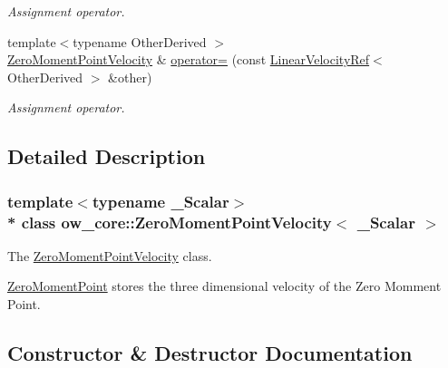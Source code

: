 \begin{DoxyCompactItemize}
\begin{DoxyCompactList}\small\item\em Assignment operator. \end{DoxyCompactList}\item 
{\footnotesize template$<$typename Other\+Derived $>$ }\\\hyperlink{classow__core_1_1ZeroMomentPointVelocity}{Zero\+Moment\+Point\+Velocity} \& \hyperlink{classow__core_1_1ZeroMomentPointVelocity_abeb37843710e91098bfe95eff09784ba}{operator=} (const \hyperlink{classow__core_1_1LinearVelocityRef}{Linear\+Velocity\+Ref}$<$ Other\+Derived $>$ \&other)\hypertarget{classow__core_1_1ZeroMomentPointVelocity_abeb37843710e91098bfe95eff09784ba}{}\label{classow__core_1_1ZeroMomentPointVelocity_abeb37843710e91098bfe95eff09784ba}

\begin{DoxyCompactList}\small\item\em Assignment operator. \end{DoxyCompactList}\end{DoxyCompactItemize}


\subsection{Detailed Description}
\subsubsection*{template$<$typename \+\_\+\+Scalar$>$\\*
class ow\+\_\+core\+::\+Zero\+Moment\+Point\+Velocity$<$ \+\_\+\+Scalar $>$}

The \hyperlink{classow__core_1_1ZeroMomentPointVelocity}{Zero\+Moment\+Point\+Velocity} class. 

\hyperlink{classow__core_1_1ZeroMomentPoint}{Zero\+Moment\+Point} stores the three dimensional velocity of the Zero Momment Point. 

\subsection{Constructor \& Destructor Documentation}
